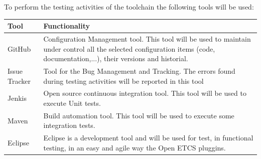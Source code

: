 To perform the testing activities of the toolchain the following tools will be used:

\begin{center}
\begin{longtable}{|p{2cm}|p{8cm}|}\hline
\textbf{Tool} & \textbf{Functionality}\\\hline
GitHub & Configuration Management tool. This tool will be used to maintain under control all the selected configuration items (code, documentation,...), their versions and historial.\\\hline
Issue Tracker & Tool for the Bug Management and Tracking. The errors found during testing activities will be reported in this tool\\\hline
Jenkis & Open source continuous integration tool. This tool will be used to execute Unit tests.\\\hline
Maven &  Build automation tool. This tool will be used to execute some integration tests.\\\hline
Eclipse & Eclipse is a development tool and will be used for test, in functional testing, in an easy and agile way the Open ETCS pluggins.\\\hline
\end{longtable}
\end{center}


